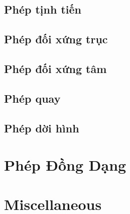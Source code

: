 \documentclass{article}
\begin{document}
\subsection{Phép tịnh tiến}

\subsection{Phép đối xứng trục}

\subsection{Phép đối xứng tâm}

\subsection{Phép quay}

\subsection{Phép dời hình}


\section{Phép Đồng Dạng}


\section{Miscellaneous}


\printbibliography[heading=bibintoc]
	
\end{document}
